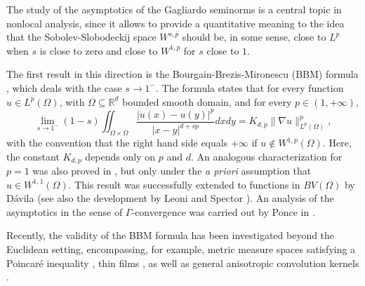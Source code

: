 \documentclass[reqno,11pt]{amsart}
\numberwithin{equation}{section}
\theoremstyle{definition} %
\theoremstyle{plain}
\theoremstyle{definition}
\theoremstyle{remark}
\def\elle#1{L^{#1}}
\def\sub{\subseteq}
\def\O{\Omega}
\def\norma#1#2{ \|#1 \|_{#2}}
\def\R{\mathbb{R}}
\newcommand{\abs}[1]{\left|#1\right|}
\begin{document}
{

The study of the asymptotics of the Gagliardo seminorms is a central topic in nonlocal analysis, since it allows to provide a quantitative meaning to the idea that the Sobolev-Slobodeckij space $W^{s,p}$ should be, in some sense, close to $\elle p$ when $s$ is close to zero and close to $W^{1,p}$ for $s$ close to $1$. 

The first result in this direction is the Bourgain-Brezis-Mironescu (BBM) formula \cite[Theorem 2]{bourgain:hal-00747692}, which deals with the case $s\to1^-$. The formula states that for every function $u\in \elle p(\O)$, with $\O\sub\R^d$ bounded smooth domain, and for every $p\in(1,+\infty)$,
\begin{equation}\label{eq:BBM}
    \lim_{s\to1^-}(1-s)\iint_{\O\times \O}\frac{\abs{u(x)-u(y)}^p}{\abs{x-y}^{d+sp}}dxdy=K_{d,p}\norma{\nabla u}{\elle p(\O)}^p,
\end{equation}
with the convention that the right hand side equals $+\infty$ if $u\notin W^{1,p}(\O)$. Here, the constant $K_{d,p}$ depends only on $p$ and $d$. An analogous characterization for $p=1$ was also proved in \cite{bourgain:hal-00747692}, but only under the \textit{a priori} assumption that $u\in W^{1,1}(\O)$.  This result was successfully extended to functions in $BV(\O)$ by Dávila \cite[Theorem 1]{davila2002open} (see also the development by Leoni and Spector \cite{Leoni_Spector}). An analysis of the asymptotics in the sense of $\Gamma$-convergence was carried out by Ponce in \cite{ponce2004new}.

Recently, the validity of the BBM formula has been investigated beyond the Euclidean setting, encompassing, for example, metric measure spaces satisfying a Poincar\'e inequality \cite{DiMarino_Squassina,oleinik2025,oleinik2025asymptotic}, thin films \cite{Braides_BBM_thin}, as well as general anisotropic convolution kernels \cite{gennaioli2025sharp,Davoli_BBM_sharp,Davoli_BBM_antisym,Kubin_Saracco_stefani}.

}
\end{document}

